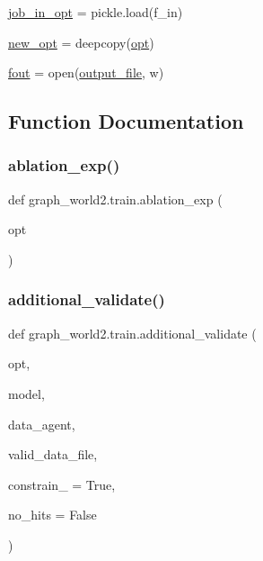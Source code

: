 \begin{DoxyCompactItemize}
\item 
\hyperlink{namespacegraph__world2_1_1train_a0dbc2533a58165ecd79f668f2889cf3e}{job\+\_\+in\+\_\+opt} = pickle.\+load(f\+\_\+in)
\item 
\hyperlink{namespacegraph__world2_1_1train_a87df49e5955f1677c3d285abb83ad60d}{new\+\_\+opt} = deepcopy(\hyperlink{namespacegraph__world2_1_1train_a286634b8300deedee0924d4ecac34fa6}{opt})
\item 
\hyperlink{namespacegraph__world2_1_1train_a098927108f0006868a4f333d6ce02443}{fout} = open(\hyperlink{namespacegraph__world2_1_1train_a15d5a47205b2c2191cc7e40b174ee66f}{output\+\_\+file}, \textquotesingle{}w\textquotesingle{})
\end{DoxyCompactItemize}


\subsection{Function Documentation}
\mbox{\label{namespacegraph__world2_1_1train_a4a2155646856189e143dbc828baef945}} 
\subsubsection{\texorpdfstring{ablation\+\_\+exp()}{ablation\_exp()}}
{\footnotesize\ttfamily def graph\+\_\+world2.\+train.\+ablation\+\_\+exp (\begin{DoxyParamCaption}\item[{}]{opt }\end{DoxyParamCaption})}

\mbox{\label{namespacegraph__world2_1_1train_aaff96a1b7f0cafac9dab96cbc02ae4d0}} 
\subsubsection{\texorpdfstring{additional\+\_\+validate()}{additional\_validate()}}
{\footnotesize\ttfamily def graph\+\_\+world2.\+train.\+additional\+\_\+validate (\begin{DoxyParamCaption}\item[{}]{opt,  }\item[{}]{model,  }\item[{}]{data\+\_\+agent,  }\item[{}]{valid\+\_\+data\+\_\+file,  }\item[{}]{constrain\+\_\+ = {\ttfamily True},  }\item[{}]{no\+\_\+hits = {\ttfamily False} }\end{DoxyParamCaption})}

